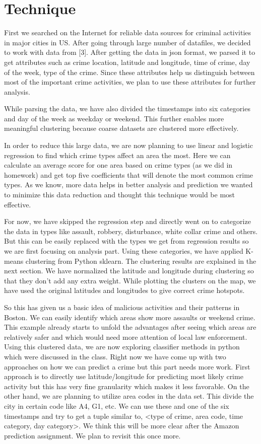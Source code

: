 \documentclass[journal, a4paper]{IEEEtran}
\begin{document}
\section{Technique}
    First we searched on the Internet for reliable data sources for criminal activities in major cities in US. After going through large number of datafiles, we decided to work with data from [3]. After getting the data in json format, we parsed it to get attributes such as crime location, latitude and longitude, time of crime, day of the week, type of the crime. Since these attributes help us distinguish between most of the important crime activities, we plan to use these attributes for further analysis. 

    While parsing the data, we have also divided the timestamps into six categories and day of the week as weekday or weekend. This further enables more meaningful clustering because coarse datasets are clustered more effectively.

    In order to reduce this large data, we are now planning to use linear and logistic regression to find which crime types affect an area the most. Here we can calculate an average score for one area based on crime types (as we did in homework) and get top five coefficients that will denote the most common crime types. As we know, more data helps in better analysis and prediction we wanted to minimize this data reduction and thought this technique would be most effective.

    For now, we have skipped the regression step and directly went on to categorize the data in types like assault, robbery, disturbance, white collar crime and others. But this can be easily replaced with the types we get from regression results so we are first focusing on analysis part. Using these categories, we have applied K-means clustering from Python sklearn. The clustering results are explained in the next section. We have normalized the latitude and longitude during clustering so that they don't add any extra weight. While plotting the clusters on the map, we have used the original latitudes and longitudes to give correct crime hotspots.

    So this has given us a basic idea of malicious activities and their patterns in Boston. We can easily identify which areas show more assaults or weekend crime. This example already starts to unfold the advantages after seeing which areas are relatively safer and which would need more attention of local law enforcement. Using this clustered data, we are now exploring classifier methods in python which were discussed in the class. Right now we have come up with two approaches on how we can predict a crime but this part needs more work. First approach is to directly use latitude/longitude for predicting most likely crime activity but this has very fine granularity which makes it less favorable. On the other hand, we are planning to utilize area codes in the data set. This divide the city in certain code like A4, G1, etc. We can use these and one of the six timestamps and try to get a tuple similar to, <type of crime, area code, time category, day category>. We think this will be more clear after the Amazon prediction assignment. We plan to revisit this once more.
    
\end{document}
